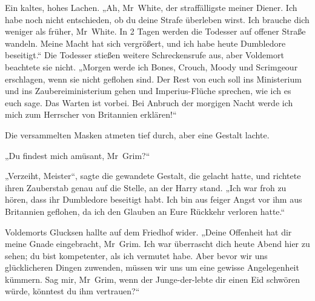 Ein kaltes, hohes Lachen.
„Ah, Mr~White, der straffälligste meiner Diener. Ich habe noch nicht entschieden, ob du deine Strafe überleben wirst. Ich brauche dich weniger als früher, Mr~White. In 2 Tagen werden die Todesser auf offener Straße wandeln. Meine Macht hat sich vergrößert, und ich habe heute Dumbledore beseitigt.“
Die Todesser stießen weitere Schreckensrufe aus, aber Voldemort beachtete sie nicht.
„Morgen werde ich Bones, Crouch, Moody und Scrimgeour erschlagen, wenn sie nicht geflohen sind. Der Rest von euch soll ins Ministerium und ins Zaubereiministerium gehen und Imperius-Flüche sprechen, wie ich es euch sage. Das Warten ist vorbei. Bei Anbruch der morgigen Nacht werde ich mich zum Herrscher von Britannien erklären!“

Die versammelten Masken atmeten tief durch, aber eine Gestalt lachte.

„Du findest mich amüsant, Mr~Grim?“

„Verzeiht, Meister“, sagte die gewandete Gestalt, die gelacht hatte, und richtete ihren Zauberstab genau auf die Stelle, an der Harry stand. „Ich war froh zu hören, dass ihr Dumbledore beseitigt habt. Ich bin aus feiger Angst vor ihm aus Britannien geflohen, da ich den Glauben an Eure Rückkehr verloren hatte.“

Voldemorts Glucksen hallte auf dem Friedhof wider.
„Deine Offenheit hat dir meine Gnade eingebracht, Mr~Grim. Ich war überrascht dich heute Abend hier zu sehen; du bist kompetenter, als ich vermutet habe. Aber bevor wir uns glücklicheren Dingen zuwenden, müssen wir uns um eine gewisse Angelegenheit kümmern. Sag mir, Mr~Grim, wenn der Junge-der-lebte dir einen Eid schwören würde, könntest du ihm vertrauen?“

